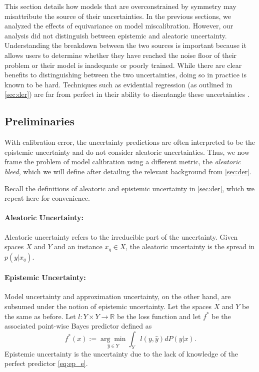 \documentclass[10pt]{article} %
\theoremstyle{definition}
\begin{document}
This section details how models that are overconstrained by symmetry may misattribute the source of their uncertainties. In the previous sections, we analyzed the effects of equivariance on model miscalibration. However, our analysis did not distinguish between epistemic and aleatoric uncertainty. Understanding the breakdown between the two sources is important because it allows users to determine whether they have reached the noise floor of their problem or their model is inadequate or poorly trained. While there are clear benefits to distinguishing between the two uncertainties, doing so in practice is known to be hard. Techniques such as evidential regression (as outlined in \cref{sec:der}) are far from perfect in their ability to disentangle these uncertainties \citep{ovadia2019can, valdenegro2022deeper, osband2023epistemic, wimmer2023quantifying, nevin2024deepuq, jurgens2024epistemic}.

\subsection{Preliminaries}

With calibration error, the uncertainty predictions are often interpreted to be the epistemic uncertainty and do not consider aleatoric uncertainties. Thus, we now frame the problem of model calibration using a different metric, the \textit{aleatoric bleed}, which we will define after detailing the relevant background from \cref{sec:der}.

Recall the definitions of aleatoric and epistemic uncertainty in \cref{sec:der}, which we repeat here for convenience.

\paragraph{Aleatoric Uncertainty:} Aleatoric uncertainty refers to the irreducible part of the uncertainty. Given spaces $X$ and $Y$ and an instance $x_q \in X$, the aleatoric uncertainty is the spread in $p(y|x_q)$.
 \paragraph{Epistemic Uncertainty:} Model uncertainty and approximation uncertainty, on the other hand, are subsumed under the notion of epistemic uncertainty. Let the spaces $X$ and $Y$ be the same as before. Let $l: Y \times Y \to \mathbb{R}$ be the loss function and let $f^*$ be the associated point-wise Bayes predictor defined as \begin{equation}
f^*(x) := \underset{\hat{y} \in Y}{\arg \min} \int_{Y}l(y, \hat{y})dP(y|x). \label{eq:ep_e}
\end{equation} Epistemic uncertainty is the uncertainty due to the lack of knowledge of the perfect predictor \cref{eq:ep_e}.
\end{document}
